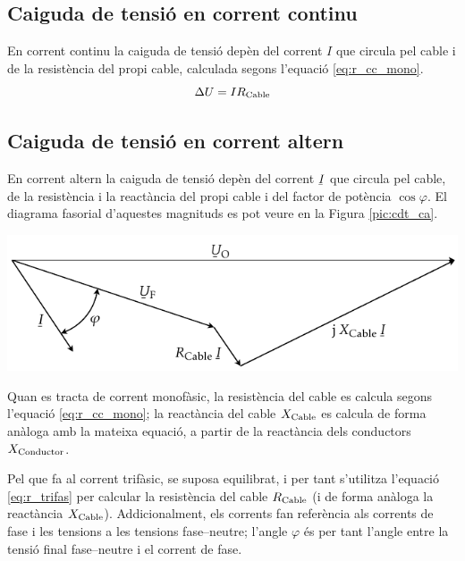 \subsection{Caiguda de tensi\'{o} en corrent continu}

En corrent continu la caiguda de tensi\'{o} dep\`{e}n del corrent $I$ que circula pel cable i de la  resist\`{e}ncia del propi cable, calculada segons l'equaci\'{o} \eqref{eq:r_cc_mono}.
\begin{equation}
   \Delta U = I R_\mathrm{Cable}
\end{equation}

\subsection{Caiguda de tensi\'{o} en corrent altern}

En corrent altern la caiguda de tensi\'{o}
dep\`{e}n del  corrent $\cmplx{I}$ que circula pel cable, de la
resist\`{e}ncia i la react\`{a}ncia del propi cable i del factor de
pot\`{e}ncia $\cos \varphi$. El diagrama fasorial d'aquestes magnituds
es pot veure en la Figura \vref{pic:cdt_ca}.

\begin{center}
   \includegraphics{Imatges/Cap-Cables-Caiguda-Tensio.pdf}
   \label{pic:cdt_ca}
\end{center}

Quan es tracta de corrent monof\`{a}sic, la resist\`{e}ncia del cable es calcula segons l'equaci\'{o}
\eqref{eq:r_cc_mono}; la react\`{a}ncia del cable $X_\mathrm{Cable}$ es calcula de forma an\`{a}loga
amb la mateixa equaci\'{o}, a partir de la react\`{a}ncia dels conductors $X_\mathrm{Conductor}$.

Pel que fa al corrent trif\`{a}sic, se suposa equilibrat, i per tant s'utilitza l'equaci\'{o}
\eqref{eq:r_trifas} per calcular la resist\`{e}ncia del cable $R_\mathrm{Cable}$ (i de forma
an\`{a}loga la react\`{a}ncia $X_\mathrm{Cable}$). Addicionalment, els corrents fan refer\`{e}ncia als
corrents de fase i les tensions a les tensions fase--neutre; l'angle $\varphi$ \'{e}s per
tant l'angle entre la tensi\'{o} final fase--neutre i el corrent de fase.

